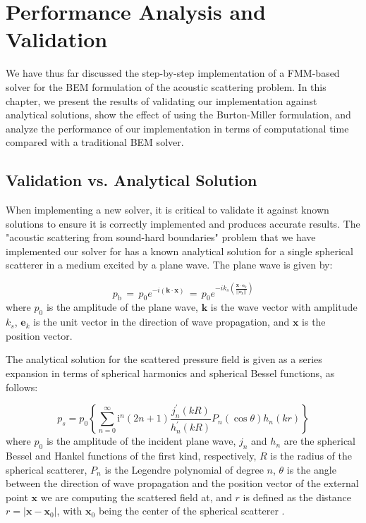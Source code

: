 \chapter{Performance Analysis and Validation}\label{chapter:performance-analysis-validation}

We have thus far discussed the step-by-step implementation of a \ac{FMM}-based solver for the \ac{BEM} formulation of the acoustic scattering problem. In this chapter, we present the results of validating our implementation against analytical solutions, show the effect of using the Burton-Miller formulation, and analyze the performance of our implementation in terms of computational time compared with a traditional \ac{BEM} solver.

\section{Validation vs. Analytical Solution} \label{sec:validation-analytical-solution}
When implementing a new solver, it is critical to validate it against known solutions to ensure it is correctly implemented and produces accurate results. The "acoustic scattering from sound-hard boundaries" problem that we have implemented our solver for has a known analytical solution for a single spherical scatterer in a medium excited by a plane wave.
The plane wave is given by:

\begin{equation*}
    p_{\mathrm{b}}\,=\,p_{0}e^{-i(\mathbf{k}\cdot\mathbf{x})}\,=\,p_{0}e^{-i k_{s}\left({\frac{\mathbf{x}\cdot\mathbf{e}_{k}}{\left|\left|\mathbf{e}_{k}\right|\right|}}\right)}
\end{equation*}
where $p_{0}$ is the amplitude of the plane wave, $\mathbf{k}$ is the wave vector with amplitude $k_s$, $\mathbf{e}_{k}$ is the unit vector in the direction of wave propagation, and $\mathbf{x}$ is the position vector.

The analytical solution for the scattered pressure field is given as a series expansion in terms of spherical harmonics and spherical Bessel functions, as follows:

\begin{equation*}
    p_{s}=p_{0}\left\{\sum_{n=0}^{\infty}\mathrm{i}^{n}(2n+1)\frac{j_{n}^{\prime}(k R)}{h_{n}^{\prime}(k R)}P_{n}(\cos\theta)h_{n}(k r)\right\}
\end{equation*}
where $p_0$ is the amplitude of the incident plane wave, $j_n$ and $h_n$ are the spherical Bessel and Hankel functions of the first kind, respectively, $R$ is the radius of the spherical scatterer, $P_n$ is the Legendre polynomial of degree $n$, $\theta$ is the angle between the direction of wave propagation and the position vector of the external point $\mathbf{x}$ we are computing the scattered field at,  and $r$ is defined as the distance $r = |\mathbf{x}-\mathbf{x}_0|$, with $\mathbf{x}_0$ being the center of the spherical scatterer \cite{marburgburtonmillermethod2016}. 


